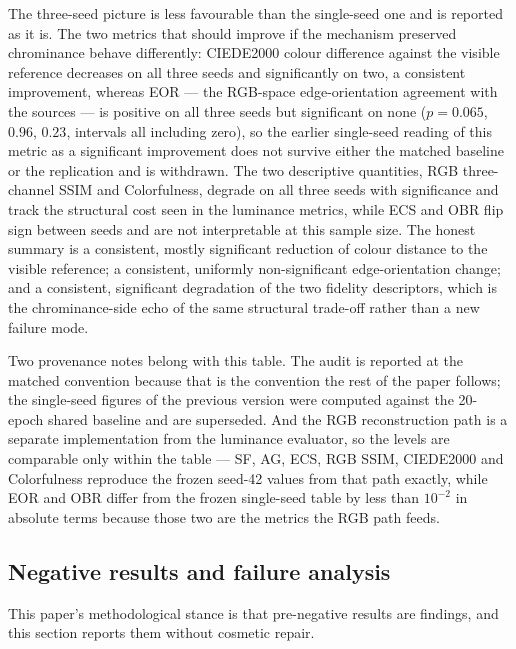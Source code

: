 \documentclass[pdflatex,sn-mathphys-num]{sn-jnl}
\theoremstyle{thmstyleone}%
\theoremstyle{thmstyletwo}%
\theoremstyle{thmstylethree}%
\begin{document}
The three-seed picture is less favourable than the single-seed one and is reported as it is. The two metrics that should improve if the mechanism preserved chrominance behave differently: CIEDE2000 colour difference against the visible reference decreases on all three seeds and significantly on two, a consistent improvement, whereas EOR --- the RGB-space edge-orientation agreement with the sources --- is positive on all three seeds but significant on none ($p = 0.065$, $0.96$, $0.23$, intervals all including zero), so the earlier single-seed reading of this metric as a significant improvement does not survive either the matched baseline or the replication and is withdrawn. The two descriptive quantities, RGB three-channel SSIM and Colorfulness, degrade on all three seeds with significance and track the structural cost seen in the luminance metrics, while ECS and OBR flip sign between seeds and are not interpretable at this sample size. The honest summary is a consistent, mostly significant reduction of colour distance to the visible reference; a consistent, uniformly non-significant edge-orientation change; and a consistent, significant degradation of the two fidelity descriptors, which is the chrominance-side echo of the same structural trade-off rather than a new failure mode.

Two provenance notes belong with this table. The audit is reported at the matched convention because that is the convention the rest of the paper follows; the single-seed figures of the previous version were computed against the 20-epoch shared baseline and are superseded. And the RGB reconstruction path is a separate implementation from the luminance evaluator, so the levels are comparable only within the table --- SF, AG, ECS, RGB SSIM, CIEDE2000 and Colorfulness reproduce the frozen seed-42 values from that path exactly, while EOR and OBR differ from the frozen single-seed table by less than $10^{-2}$ in absolute terms because those two are the metrics the RGB path feeds.

\subsection{Negative results and failure analysis}\label{sec:exp:negative}

This paper's methodological stance is that pre-negative results are findings, and this section reports them without cosmetic repair.
\end{document}
